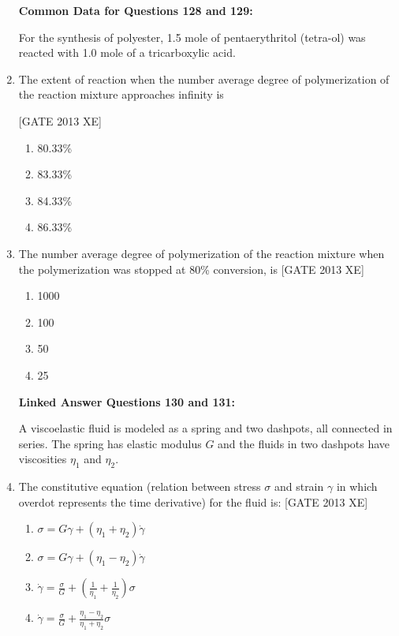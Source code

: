 \documentclass[journal,12pt,onecolumn]{IEEEtran}
\theoremstyle{remark}
\begin{document}
\begin{enumerate}
\textbf{Common Data for Questions 128 and 129:}

For the synthesis of polyester, 1.5 mole of pentaerythritol (tetra-ol) was reacted with 1.0 mole of a tricarboxylic acid.

 \item The extent of reaction when the number average degree of polymerization of the reaction mixture approaches infinity is
    
    \hfill [GATE 2013 XE]
    
    \begin{multicols}{4}
    \begin{enumerate}
        \item 80.33\%
        \item 83.33\%
        \item 84.33\%
        \item 86.33\%
    \end{enumerate}
    \end{multicols}

    \item The number average degree of polymerization of the reaction mixture when the polymerization was stopped at 80\% conversion, is \hfill [GATE 2013 XE]
    \begin{multicols}{4}
    \begin{enumerate}
        \item 1000
        \item 100
        \item 50
        \item 25
    \end{enumerate}
    \end{multicols}


\textbf{Linked Answer Questions 130 and 131:}

A viscoelastic fluid is modeled as a spring and two dashpots, all connected in series. The spring has elastic modulus $G$ and the fluids in two dashpots have viscosities $\eta_1$ and $\eta_2$.



    \item The constitutive equation (relation between stress $\sigma$ and strain $\gamma$ in which overdot represents the time derivative) for the fluid is: \hfill [GATE 2013 XE]
    \begin{multicols}{2}
    \begin{enumerate}
        \item $\sigma = G \gamma + (\eta_1 + \eta_2) \dot{\gamma}$
        \item $\sigma = G \gamma + (\eta_1 - \eta_2) \dot{\gamma}$
        \item $\dot{\gamma} = \frac{\sigma}{G} + \left(\frac{1}{\eta_1} + \frac{1}{\eta_2}\right)\sigma$
        \item $\dot{\gamma} = \frac{\sigma}{G} + \frac{\eta_1 - \eta_2}{\eta_1 + \eta_2} \sigma$
    \end{enumerate}
    \end{multicols}


\end{enumerate}
\end{document}

